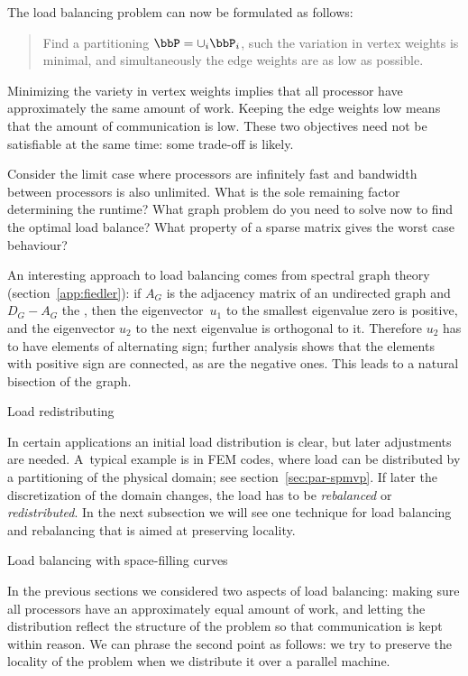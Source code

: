 The load balancing problem can now be formulated as
follows:
\begin{quote}
  Find a partitioning $\bbP=\cup_i \bbP_i$, such the variation in
  vertex weights is minimal, and simultaneously the edge weights are
  as low as possible.
\end{quote}
Minimizing the variety in vertex weights implies that all processor
have approximately the same amount of work. Keeping the edge weights
low means that the amount of communication is low. These two
objectives need not be satisfiable at the same time: some trade-off is
likely. 

\begin{exercise}
  Consider the limit case where processors are infinitely fast and
  bandwidth between processors is also unlimited. What is the sole
  remaining factor determining the runtime? What graph problem do you
  need to solve now to find the optimal load balance? What property of
  a sparse matrix gives the worst case behaviour?
\end{exercise}

An interesting approach to load balancing comes from spectral graph
theory (section~\ref{app:fiedler}): if $A_G$ is the adjacency matrix
of an undirected graph and $D_G-A_G$ the ,
then the eigenvector~$u_1$ to the smallest eigenvalue zero is
positive, and the eigenvector $u_2$ to the next eigenvalue is
orthogonal to it. Therefore $u_2$ has to have elements of alternating
sign; further analysis shows that the elements with positive sign are
connected, as are the negative ones. This leads to a natural bisection
of the graph.

 {Load redistributing}

In certain applications an initial load distribution is clear, but
later adjustments are needed. A~typical example is in \ac{FEM} codes,
where load can be distributed by a partitioning of the physical
domain; see section~\ref{sec:par-spmvp}. If later the discretization
of the domain changes, the load has to be
\emph{rebalanced} or
\emph{redistributed}. In the next
subsection we will see one technique for load balancing and
rebalancing that is aimed at preserving locality.

 {Load balancing with space-filling curves}
\label{sec:space-filling}

In the previous sections we considered two aspects of load balancing:
making sure all processors have an approximately equal amount of work,
and letting the distribution reflect the structure of the problem so
that communication is kept within reason. We can phrase the second
point as follows: we try to preserve the locality of the problem when
we distribute it over a parallel machine.

